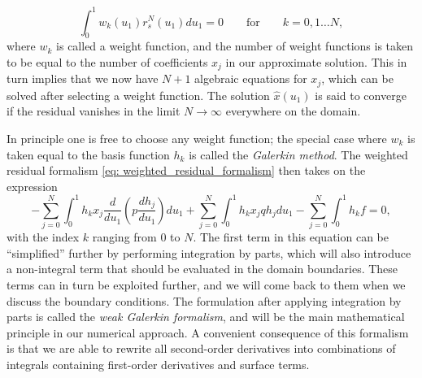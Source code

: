 \begin{equation} \label{eq: weighted_residual_formalism}
  \int_0^1 w_k(u_1) r_s^N(u_1)du_1 = 0 \qquad\text{for}\qquad k = 0, 1 \ldots N,
\end{equation}
where $w_k$ is called a weight function, and the number of weight functions is taken to be equal to the number of coefficients $x_j$ in our approximate solution. This in turn implies that we now have $N + 1$ algebraic equations for $x_j$, which can be solved after selecting a weight function. The solution $\hat{x}(u_1)$ is said to converge if the residual vanishes in the limit $N \rightarrow \infty$ everywhere on the domain.

In principle one is free to choose any weight function; the special case where $w_k$ is taken equal to the basis function $h_k$ is called the \emph{Galerkin method}. The weighted residual formalism
\eqref{eq: weighted_residual_formalism} then takes on the expression
\begin{equation}
  -\sum_{j=0}^N\int_0^1 h_k x_j \frac{d}{du_1}\left(p\frac{dh_j}{du_1}\right)du_1
  + \sum_{j=0}^N\int_0^1 h_k x_j q h_j du_1
  - \sum_{j=0}^N\int_0^1 h_k f = 0,
\end{equation}
with the index $k$ ranging from 0 to $N$. The first term in this equation can be ``simplified'' further by performing integration by parts, which will also introduce a non-integral term that should be evaluated in the domain boundaries. These terms can in turn be exploited further, and we will come back to them when we discuss the boundary conditions. The formulation after applying integration by parts is called the \emph{weak Galerkin formalism}, and will be the main mathematical principle in our numerical approach. A convenient consequence of this formalism is that we are able to rewrite all second-order derivatives into combinations of integrals containing first-order derivatives and surface terms.

